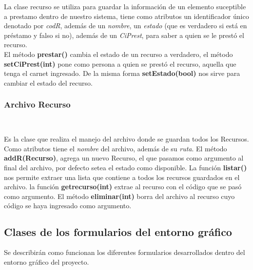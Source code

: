 \documentclass[12pt]{article}
\begin{document}
La clase recurso se utiliza para guardar la información de un elemento suceptible a prestamo dentro de nuestro sistema, tiene como atributos un identificador único denotado por \textit{codR}, además de un \textit{nombre}, un \textit{estado} (que es verdadero si está en préstamo y falso si no), además de un \textit{CiPrest}, para saber a quien se le prestó el recurso.   \\ 
El método \textbf{prestar()} cambia el estado de un recurso a verdadero, el método \textbf{setCiPrest(int)} pone como persona a quien se prestó el recurso, aquella que tenga el carnet ingresado.  De la misma forma \textbf{setEstado(bool)} nos sirve para cambiar el estado del recurso.  

\subsubsection{Archivo Recurso}
\begin{center}
\\
\end{center}

Es la clase que realiza el manejo del archivo donde se guardan todos los Recursos.  Como atributos tiene el \textit{nombre }del archivo, además de su \textit{ruta}.  El método \textbf{addR(Recurso)}, agrega un nuevo Recurso, el que pasamos como argumento al final del archivo, por defecto setea el estado como disponible.  La función \textbf{listar()} nos permite extraer una lista que contiene a todos los recursos guardados en el archivo. la función \textbf{getrecurso(int)} extrae al recurso con el código que se pasó como argumento.  El método \textbf{eliminar(int)} borra del archivo al recurso cuyo código se haya ingresado como argumento. 


\subsection{Clases de los formularios del entorno gráfico}
Se describirán como funcionan los diferentes formularios desarrollados dentro del entorno gráfico del proyecto.  
\end{document}
